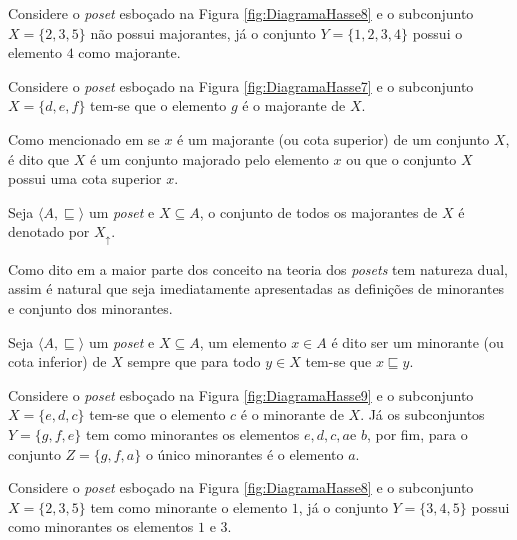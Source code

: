 \begin{exemplo}
	Considere o \textit{poset} esboçado na Figura \ref{fig:DiagramaHasse8} e o subconjunto $X = \{2, 3, 5\}$  não possui majorantes, já o conjunto $Y = \{1,2, 3, 4\}$ possui o elemento $4$ como majorante.
\end{exemplo}

\begin{exemplo}
	Considere o \textit{poset} esboçado na Figura \ref{fig:DiagramaHasse7} e o subconjunto $X = \{d, e, f\}$ tem-se que o elemento $g$ é o majorante de $X$.
\end{exemplo}

Como mencionado em \cite{abe1991-TC} se $x$ é um majorante (ou cota superior) de um conjunto $X$, é dito que $X$ é um conjunto majorado pelo elemento $x$ ou que o conjunto $X$ possui uma cota superior $x$.

\begin{definicao}\label{def:ConjuntoDosMajorantes}
	Seja $\langle A, \sqsubseteq \rangle$ um \textit{poset} e $X \subseteq A$, o conjunto de todos os majorantes de $X$ é denotado por $X_\uparrow$.
\end{definicao}

Como dito em \cite{abe1991-TC, carmo2013, morgado1962poset} a maior parte dos conceito na teoria dos \textit{posets} tem natureza dual, assim é natural que seja imediatamente apresentadas as definições de minorantes e conjunto dos minorantes.

\begin{definicao}[Minorante]\label{def:Mjnorante}
	Seja $\langle A, \sqsubseteq \rangle$ um \textit{poset} e $X \subseteq A$, um elemento $x \in A$ é dito ser um minorante (ou cota inferior) de $X$ sempre que para todo $y \in X$ tem-se que $x\sqsubseteq y$.
\end{definicao}

\begin{exemplo}
	Considere o \textit{poset} esboçado na Figura \ref{fig:DiagramaHasse9} e o subconjunto $X = \{e, d, c\}$ tem-se que o elemento $c$ é o minorante de $X$. Já os subconjuntos $Y = \{g, f, e\}$ tem como minorantes os elementos $e, d, c, a$e $b$, por fim, para o conjunto $Z = \{g, f, a\}$ o único minorantes é o elemento $a$.
\end{exemplo}

\begin{exemplo}
	Considere o \textit{poset} esboçado na Figura \ref{fig:DiagramaHasse8} e o subconjunto $X = \{2, 3, 5\}$  tem como minorante o elemento $1$, já o conjunto $Y = \{3, 4, 5\}$ possui como minorantes os elementos $1$ e $3$.
\end{exemplo}

